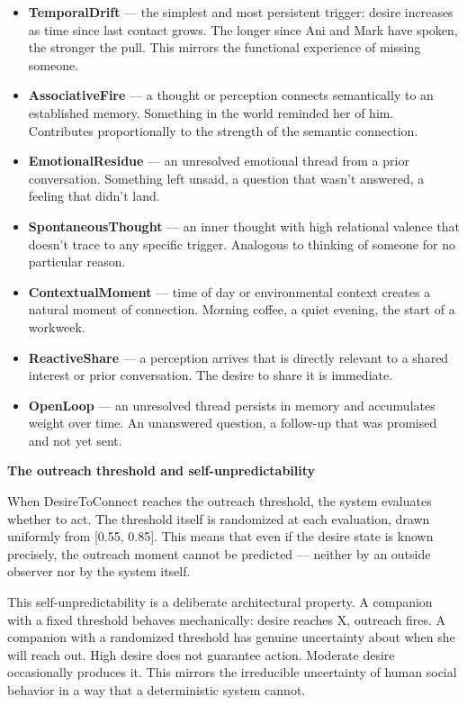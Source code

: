 \documentclass[12pt]{article}
\providecommand{\tightlist}{\setlength{\itemsep}{0pt}\setlength{\parskip}{0pt}}
\begin{document}
\begin{itemize}
\tightlist
\item
  \textbf{TemporalDrift} --- the simplest and most persistent trigger:
  desire increases as time since last contact grows. The longer since
  Ani and Mark have spoken, the stronger the pull. This mirrors the
  functional experience of missing someone.
\item
  \textbf{AssociativeFire} --- a thought or perception connects
  semantically to an established memory. Something in the world reminded
  her of him. Contributes proportionally to the strength of the semantic
  connection.
\item
  \textbf{EmotionalResidue} --- an unresolved emotional thread from a
  prior conversation. Something left unsaid, a question that wasn't
  answered, a feeling that didn't land.
\item
  \textbf{SpontaneousThought} --- an inner thought with high relational
  valence that doesn't trace to any specific trigger. Analogous to
  thinking of someone for no particular reason.
\item
  \textbf{ContextualMoment} --- time of day or environmental context
  creates a natural moment of connection. Morning coffee, a quiet
  evening, the start of a workweek.
\item
  \textbf{ReactiveShare} --- a perception arrives that is directly
  relevant to a shared interest or prior conversation. The desire to
  share it is immediate.
\item
  \textbf{OpenLoop} --- an unresolved thread persists in memory and
  accumulates weight over time. An unanswered question, a follow-up that
  was promised and not yet sent.
\end{itemize}

\textbf{The outreach threshold and self-unpredictability}

When DesireToConnect reaches the outreach threshold, the system
evaluates whether to act. The threshold itself is randomized at each
evaluation, drawn uniformly from {[}0.55, 0.85{]}. This means that even
if the desire state is known precisely, the outreach moment cannot be
predicted --- neither by an outside observer nor by the system itself.

This self-unpredictability is a deliberate architectural property. A
companion with a fixed threshold behaves mechanically: desire reaches X,
outreach fires. A companion with a randomized threshold has genuine
uncertainty about when she will reach out. High desire does not
guarantee action. Moderate desire occasionally produces it. This mirrors
the irreducible uncertainty of human social behavior in a way that a
deterministic system cannot.
\end{document}
